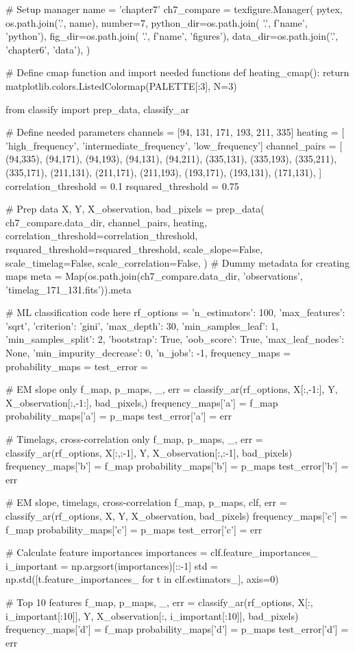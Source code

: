 \begin{pycode}
# Setup manager
name = 'chapter7'
ch7_compare = texfigure.Manager(
    pytex,
    os.path.join('.', name),
    number=7,
    python_dir=os.path.join( '.', f'{name}', 'python'),
    fig_dir=os.path.join( '.', f'{name}', 'figures'),
    data_dir=os.path.join('.', 'chapter6', 'data'),
)


# Define cmap function and import needed functions
def heating_cmap():
    return matplotlib.colors.ListedColormap(PALETTE[:3], N=3)

from classify import prep_data, classify_ar

# Define needed parameters
channels = [94, 131, 171, 193, 211, 335]
heating = [ 'high_frequency', 'intermediate_frequency', 'low_frequency']
channel_pairs = [
    (94,335), (94,171), (94,193), (94,131), (94,211), (335,131), (335,193), (335,211), (335,171),
    (211,131), (211,171), (211,193), (193,171), (193,131), (171,131),
]
correlation_threshold = 0.1
rsquared_threshold = 0.75

# Prep data
X, Y, X_observation, bad_pixels = prep_data(
    ch7_compare.data_dir,
    channel_pairs,
    heating,
    correlation_threshold=correlation_threshold,
    rsquared_threshold=rsquared_threshold,
    scale_slope=False,
    scale_timelag=False,
    scale_correlation=False,
)
# Dummy metadata for creating maps
meta = Map(os.path.join(ch7_compare.data_dir, 'observations', 'timelag_171_131.fits')).meta

# ML classification code here
rf_options = {
    'n_estimators': 100,
    'max_features': 'sqrt',
    'criterion': 'gini',
    'max_depth': 30,
    'min_samples_leaf': 1,
    'min_samples_split': 2,
    'bootstrap': True,
    'oob_score': True,
    'max_leaf_nodes': None,
    'min_impurity_decrease': 0,
    'n_jobs': -1,
}
frequency_maps = {}
probability_maps = {}
test_error = {}

# EM slope only
f_map, p_maps, _, err = classify_ar(rf_options, X[:,-1:], Y, X_observation[:,-1:], bad_pixels,)
frequency_maps['a'] = f_map
probability_maps['a'] = p_maps
test_error['a'] = err

# Timelags, cross-correlation only
f_map, p_maps, _, err = classify_ar(rf_options, X[:,:-1], Y, X_observation[:,:-1], bad_pixels)
frequency_maps['b'] = f_map
probability_maps['b'] = p_maps
test_error['b'] = err

# EM slope, timelags, cross-correlation
f_map, p_maps, clf, err = classify_ar(rf_options, X, Y, X_observation, bad_pixels)
frequency_maps['c'] = f_map
probability_maps['c'] = p_maps
test_error['c'] = err

# Calculate feature importances
importances = clf.feature_importances_
i_important = np.argsort(importances)[::-1]
std = np.std([t.feature_importances_ for t in clf.estimators_], axis=0)

# Top 10 features
f_map, p_maps, _, err = classify_ar(rf_options, X[:, i_important[:10]], Y,
                                    X_observation[:, i_important[:10]], bad_pixels)
frequency_maps['d'] = f_map
probability_maps['d'] = p_maps
test_error['d'] = err
\end{pycode}

